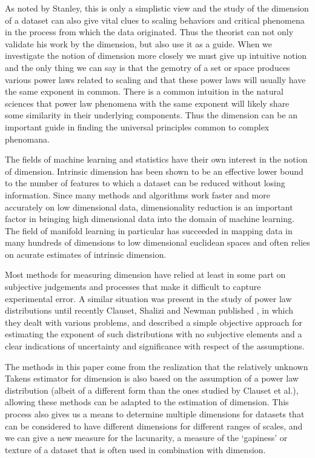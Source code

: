 \documentclass[10pt]{article}
\begin{document}
As noted by Stanley, this is only a simplistic view and the study of the dimension of a dataset can also give vital clues to scaling behaviors and critical phenomena in the process from which the data originated. Thus the theorist can not only validate his work by the dimension, but also use it as a guide. When we investigate the notion of dimension more closely we must give up intuitive notion and the only thing we can say is that the gemotry of a set or space produces various power laws related to scaling and that these power laws will usually have the same exponent in common. There is a common intuition in the natural sciences that power law phenomena with the same exponent will likely share some similarity in their underlying components. Thus the dimension can be an important guide in finding the universal principles common to  complex phenomana.

The fields of machine learning and statistics have their own interest in the notion of dimension. Intrinsic dimension has been shown to be an effective lower bound to the number of features to which a dataset can be reduced without losing information.\cite{kumaraswamy2008fractal} Since many methods and algorithms work faster and more accurately on low dimensional data, dimensionality reduction is an important factor in bringing high dimensional data into the domain of machine learning. The field of manifold learning in particular has succeeded in mapping data in many hundreds of dimensions to low dimensional euclidean spaces\cite{roweis2000nonlinear} and often relies on acurate estimates of intrinsic dimension.\cite{levina2004maximum} 

Most methods for measuring dimension have relied at least in some part on subjective judgements and processes that make it difficult to capture experimental error. A similar situation was present in the study of power law distributions until recently Clauset, Shalizi and Newman published \cite{clauset2007power}, in which they dealt with various problems, and described a simple objective approach for estimating the exponent of such distributions with no subjective elements and a clear indications of uncertainty and significance with respect of the assumptions.

The methods in this paper come from the realization that the relatively unknown Takens estimator for dimension is also based on the assumption of a power law distribution (albeit of a different form than the ones studied by Clauset et al.), allowing these methods can be adapted to the estimation of dimension. This process also gives us a means to determine multiple dimensions for datasets that can be considered to have different dimensions for different ranges of scales, and we can give a new measure for the lacunarity, a measure of the `gapiness' or texture of a dataset that is often used in combination with dimension. 
\end{document}
